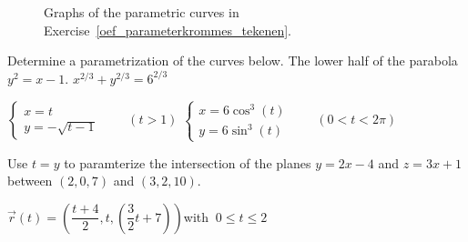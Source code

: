 \begin{Answer}
\begin{figure}[H]
{            \hspace{0.5cm}
            \fi
            }
            \caption{Graphs of the parametric curves in Exercise~\ref{oef_parameterkrommes_tekenen}.}
            \label{fig_parameterkrommes}
        \end{figure}
\end{Answer}
	
\begin{Exercise} Determine a parametrization of the curves below. 
	\Question[difficulty = 1] The lower half of the parabola $y^2 = x-1$.
	\Question[difficulty = 2] $x^{2/3} + y^{2/3} = 6^{2/3}$

\end{Exercise}

\begin{Answer}\phantom{}
    \begin{multicols}{2}
	
		\Question $\left\{\begin{array}{l} x = t \\[0.5cm] y = - \sqrt{t-1} \end{array}\right.\qquad (t>1) $
		\Question $\left\{\begin{array}{l} x = 6 \cos^3(t) \\[0.5cm] y =  6 \sin^3(t) \end{array}\right.\qquad (0<t<2 \pi) $
\EndCurrentQuestion
	\end{multicols}
\end{Answer}

\begin{Exercise}[difficulty = 1] Use $t=y$ to paramterize the intersection of the planes $y=2x-4$ and $z=3x+1$ between $(2,0,7)$ and $(3,2,10)$. 

\end{Exercise}

\begin{Answer}\phantom{}
    $\vec r (t) = \left( \dfrac{t+4}{2}, t , \left(\dfrac{3}{2}t+7 \right) \right)$\quad with $\ 0 \leq t \leq 2 $
\end{Answer}

